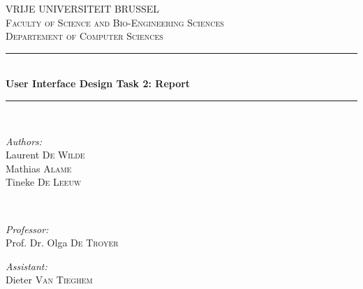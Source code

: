 \documentclass[11pt, a4paper,svglistings]{report}
\begin{document}
\begin{titlepage}

\newcommand{\HRule}{\rule{\linewidth}{0.5mm}}

\center


\textsc{\LARGE VRIJE UNIVERSITEIT BRUSSEL}\\[1.5cm] 
\textsc{\Large Faculty of Science and Bio-Engineering Sciences}\\[0.5cm] 
\textsc{\large Departement of Computer Sciences}\\[0.5cm] 


\HRule \\[0.7cm]
{ \huge \bfseries  User Interface Design Task 2: Report}\\[0.4cm] 
\HRule \\[1.5cm]
 

\begin{minipage}{0.4\textwidth}
\begin{flushleft} \large
\emph{Authors:}\\
Laurent \textsc{De Wilde} \\
Mathias \textsc{Alame} \\
Tineke \textsc{De Leeuw}
\end{flushleft}
\end{minipage}
~
\begin{minipage}{0.4\textwidth}
\begin{flushright} \large
\emph{Professor:} \\
Prof. Dr. Olga \textsc{De Troyer}

\emph{Assistant:} \\
Dieter \textsc{Van Tieghem}
\end{flushright}
\end{minipage}\\[4cm]



\end{titlepage}
\end{document}
